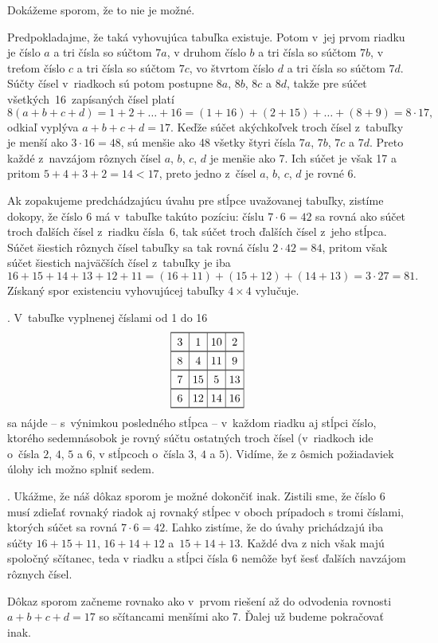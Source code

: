 {%
Dokážeme sporom, že to nie je možné.

Predpokladajme, že taká vyhovujúca tabuľka existuje.
Potom v~jej prvom riadku je číslo $a$
a tri čísla so súčtom $7a$,
v druhom číslo $b$ a tri čísla so súčtom $7b$, v treťom číslo $c$
a tri čísla so súčtom $7c$, vo štvrtom číslo $d$ a tri čísla so súčtom $7d$.
Súčty čísel v~riadkoch sú potom postupne $8a$, $8b$, $8c$ a $8d$, takže pre
súčet všetkých~16~zapísaných čísel platí
$$
8(a+b+c+d)=1+2+\ldots+16=(1+16)+(2+15)+\ldots+(8+9)=8\cdot17,
$$
odkiaľ vyplýva $a+b+c+d=17$. Keďže súčet akýchkoľvek troch čísel
z~tabuľky je menší ako $3\cdot16=48$, sú menšie ako 48 všetky
štyri čísla $7a$, $7b$, $7c$ a $7d$. Preto každé z~navzájom
rôznych čísel $a$, $b$, $c$, $d$ je menšie ako 7. Ich súčet
je však 17 a pritom $5+4+3+2=14<17$, preto jedno z~čísel
$a$, $b$, $c$, $d$ je rovné 6.

Ak zopakujeme predchádzajúcu úvahu pre stĺpce uvažovanej tabuľky,
zistíme dokopy, že číslo 6 má v~tabuľke takúto pozíciu:
číslu $7\cdot6=42$ sa rovná ako súčet troch ďalších čísel z~riadku
čísla~6, tak súčet troch ďalších čísel z~jeho stĺpca. Súčet šiestich
rôznych čísel tabuľky sa tak rovná číslu $2\cdot42=84$, pritom
však súčet šiestich najväčších čísel z~tabuľky je iba
$$
16+15+14+13+12+11=(16+11)+(15+12)+(14+13)=3\cdot27=81.
$$
Získaný spor existenciu vyhovujúcej tabuľky $4\times4$ vylučuje.

.
V~tabuľke vyplnenej číslami od 1 do 16
$$
\vbox
{\offinterlineskip\everycr{\noalign{\hrule}}\let\par\cr\obeylines %
\halign{\vrule#&&\hbox to 16pt{\hss#\unskip\hss}\vrule height 11.2pt depth 4.8pt\cr
&3&1&10&2\cr
&8&4&11&9\cr
&7&15&5&13\cr
&6&12&14&16\cr
}}
$$
sa nájde -- s~výnimkou posledného stĺpca -- v~každom riadku aj stĺpci
číslo, ktorého sedemnásobok je rovný súčtu ostatných troch čísel
(v~riadkoch ide o~čísla $2$, $4$, $5$ a $6$, v stĺpcoch o~čísla
$3$, $4$ a $5$). Vidíme, že z ôsmich požiadaviek úlohy ich možno splniť
sedem.

.
Ukážme, že náš dôkaz sporom je možné dokončiť inak. Zistili sme, že
číslo 6 musí zdieľať rovnaký riadok aj rovnaký stĺpec v oboch
prípadoch s tromi číslami, ktorých súčet sa rovná $7\cdot 6=42$.
Ľahko zistíme, že do úvahy prichádzajú iba súčty
$16+15+11$, $16+14+12$ a~$15+14+13$. Každé
dva z nich však majú spoločný sčítanec, teda v riadku a stĺpci
čísla 6 nemôže byť šesť ďalších navzájom rôznych čísel.

\ineriesenie
Dôkaz sporom začneme rovnako ako v~prvom riešení až do odvodenia
rovnosti $a+b+c+d=17$ so sčítancami menšími ako 7. Ďalej už budeme
pokračovať inak.

}
